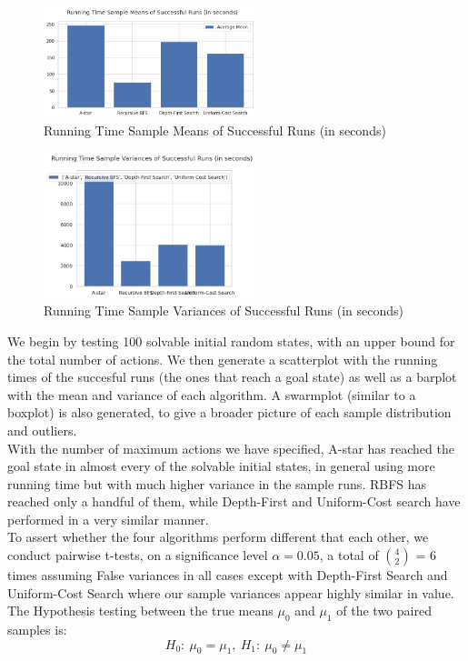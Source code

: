 \documentclass{article}
\begin{document}
    \begin{figure}[h]
    	\centering
    	\includegraphics[width=0.55\textwidth]{images/img3.png}
    	\caption{Running Time Sample Means of Successful Runs (in seconds)}
    \end{figure}

    \begin{figure}[h]
    	\centering
    	\includegraphics[width=0.55\textwidth]{images/img4.png}
    	\caption{Running Time Sample Variances of Successful Runs (in seconds)}
    \end{figure}

We begin by testing 100 solvable initial random states, with an upper bound for the total number of actions. We then generate a scatterplot with the running times of the succesful runs (the ones that reach a goal state) as well as a barplot with the mean and variance of each algorithm. A swarmplot (similar to a boxplot) is also generated, to give a broader picture of each sample distribution and outliers. \\

With the number of maximum actions we have specified, A-star has reached the goal state in almost every of the solvable initial states, in general using more running time but with much higher variance in the sample runs. RBFS has reached only a handful of them, while Depth-First and Uniform-Cost search have performed in a very similar manner. \\

To assert whether the four algorithms perform different that each other, we conduct pairwise t-tests, on a significance level $\alpha = 0.05$, a total of $4\choose2$ = 6 times assuming False variances in all cases except with Depth-First Search and Uniform-Cost Search where our sample variances appear highly similar in value. The Hypothesis testing between the true means $\mu_0$ and $\mu_1$ of the two paired samples is: $$H_0: ~\mu_0 = \mu_1, ~H_1: ~\mu_0 \neq \mu_1$$
\end{document}
